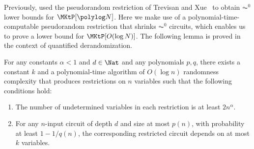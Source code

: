 \documentclass{toc}
\begin{document}
Previously, \cite{ChenHOPRS20_innovations_conf} used the pseudorandom restriction of Trevisan and Xue~\cite{TrevisanX13_coco_conf}
to obtain $\AC^0$ lower bounds for $\MKtP[\polylog N]$.
Here we make use of a polynomial-time-computable pseudorandom restriction that shrinks $\AC^0$ circuits,
which enables us to prove a lower bound for $\MKtP[O(\log N)]$.
The following lemma is proved in the context of quantified derandomization.
\begin{lemma}
  \label{lemma_pseudorandomrestriction}
  For any constants $\alpha < 1$ and $d \in \Nat$ and any polynomials $p, q$,
  there exists a constant $k$ and a polynomial-time algorithm of $O(\log n)$ randomness complexity that
  produces restrictions on $n$ variables such that the following conditions hold:
  \begin{enumerate}
    \item
          The number of undetermined variables in each restriction is at least $2 n^\alpha$.
    \item
          For any $n$-input circuit of depth $d$ and size at most $p(n)$,
          with probability at least $1 - 1 / q(n)$,
          the corresponding restricted circuit depends on at most $k$ variables.
  \end{enumerate}
\end{lemma}
\end{document}
